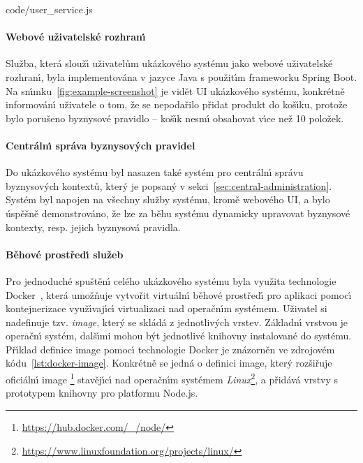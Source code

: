 
{code/user_service.js}

\paragraph{Webové uživatelské rozhran\'{\i}}

Služba, která slouž\'{\i} uživatelům ukázkového systému jako webové uživatelské
rozhran\'{\i}, byla implementována v jazyce Java s použit\'{\i}m frameworku Spring Boot.
Na sn\'{\i}mku~\ref{fig:example-screenshot} je vidět UI ukázkového systému,
konkrétně informován\'{\i} uživatele o tom, že se nepodařilo přidat produkt
do koš\'{\i}ku, protože bylo porušeno byznysové pravidlo – koš\'{\i}k nesm\'{\i} obsahovat
v\'{\i}ce než 10 položek.

\paragraph{Centráln\'{\i} správa byznysov\'ych pravidel}

Do ukázkového systému byl nasazen také systém pro centráln\'{\i} správu byznysov\'ych kontextů,
kter\'y je popsan\'y v sekci~\ref{sec:central-administration}. Systém byl napojen na všechny
služby systému, kromě webového \gls{UI}, a bylo úspěšně demonstrováno, že lze za běhu systému
dynamicky upravovat byznysové kontexty, resp. jejich byznysová pravidla.

\paragraph{Běhové prostřed\'{\i} služeb}
Pro jednoduché spuštěn\'{\i} celého ukázkového systému byla využita technologie
Docker~\cite{merkel2014docker}, která umožňuje vytvořit virtuáln\'{\i} běhové prostřed\'{\i}
pro aplikaci pomoc\'{\i} kontejnerizace využ\'{\i}vaj\'{\i}c\'{\i} virtualizaci nad operačn\'{\i}m systémem.
Uživatel si nadefinuje tzv. \textit{image}, kter\'y se skládá z jednotliv\'ych vrstev.
Základn\'{\i} vrstvou je operačn\'{\i} systém, dalš\'{\i}mi mohou b\'yt jednotlivé knihovny instalované do systému.
Př\'{\i}klad definice image pomoc\'{\i} technologie Docker je znázorněn ve zdrojovém
kódu~\ref{lst:docker-image}. Konkrétně se jedná o definici image, kter\'y
rozšiřuje oficiáln\'{\i} image \footnote{\url{https://hub.docker.com/\_/node/}}
stavěj\'{\i}c\'{\i} nad operačn\'{\i}m systémem \textit{Linux}\footnote{\url{https://www.linuxfoundation.org/projects/linux/}},
a přidává vrstvy s prototypem knihovny pro platformu Node.js.

